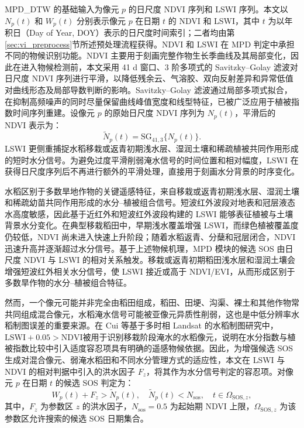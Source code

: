 MPD\_DTW 的基础输入为像元 \(p\) 的日尺度 NDVI 序列和 LSWI 序列。本文以 \(N_p(t)\) 和 \(W_p(t)\) 分别表示像元 \(p\) 在日期 \(t\) 的 NDVI 和 LSWI，其中 \(t\) 为以年积日（Day of Year, DOY）表示的日尺度时间索引；二者均由第\ref{sec:vi_preprocess}节所述预处理流程获得。NDVI 和 LSWI 在 MPD 判定中承担不同的物候识别功能。NDVI 主要用于刻画完整作物生长季曲线及其局部变化，因此在进入物候检测前，本文采用 41 d 窗口、3 阶多项式的 Savitzky--Golay 滤波对日尺度 NDVI 序列进行平滑，以降低残余云、气溶胶、双向反射差异和异常低值对曲线形态及局部导数判断的影响。Savitzky--Golay 滤波通过局部多项式拟合，在抑制高频噪声的同时尽量保留曲线峰值宽度和线型特征，已被广泛应用于植被指数时间序列重建\cite{Chen2004RSE}。设像元 \(p\) 的原始日尺度 NDVI 序列为 \(N_p(t)\)，平滑后的 NDVI 表示为：
\begin{equation}
    \widetilde{N}_p(t)=\mathrm{SG}_{41,3}\{N_p(t)\}.
    \label{eq:sg_ndvi}
\end{equation}
LSWI 更侧重捕捉水稻移栽或返青初期浅水层、湿润土壤和稀疏植被共同作用形成的短时水分信号。为避免过度平滑削弱淹水信号的时间位置和相对幅度，LSWI 在获得日尺度序列后不再进行额外的平滑处理，直接用于刻画水分背景的时序变化。

水稻区别于多数旱地作物的关键遥感特征，来自移栽或返青初期浅水层、湿润土壤和稀疏幼苗共同作用形成的水分--植被组合信号。短波红外波段对地表和冠层液态水高度敏感，因此基于近红外和短波红外波段构建的 LSWI 能够表征植被与土壤背景水分变化\cite{Gao1996}。在典型移栽稻田中，早期浅水覆盖增强 LSWI，而绿色植被覆盖度仍较低，NDVI 尚未进入快速上升阶段；随着水稻返青、分蘖和冠层闭合，NDVI 迅速升高并逐渐超过水分信号。基于上述物候机理，MPD 模块的候选 SOS 由日尺度 NDVI 与 LSWI 的相对关系触发。移栽或返青初期稻田浅水层和湿润土壤会增强短波红外相关水分信号，使 LSWI 接近或高于 NDVI/EVI，从而形成区别于多数旱作物的水分--植被组合特征\cite{Xiao2005,Xiao2006}。

然而，一个像元可能并非完全由稻田组成，稻田、田埂、沟渠、裸土和其他作物常共同组成混合像元，水稻淹水信号可能被亚像元异质性削弱，这也是中低分辨率水稻制图误差的重要来源\cite{Teluguntla2015RS,Han2021}。在 Cui 等基于多时相 Landsat 的水稻制图研究中，\(\mathrm{LSWI}+0.05>\mathrm{NDVI}\)被用于识别移栽阶段淹水的水稻像元\cite{Cui2015}，说明在水分指数与植被指数比较中引入适度容忍项具有明确的遥感物候依据。因此，为增强候选 SOS 生成对混合像元、弱淹水稻田和不同水分管理方式的适应性，本文在 LSWI 与 NDVI 的相对判据中引入的洪水因子 \(F_z\)，将其作为水分信号判定的容忍项。对像元 \(p\) 在日期 \(t\) 的候选 SOS 判定为：
\begin{equation}
    W_p(t)+F_z>\widetilde{N}_p(t), \quad
\widetilde{N}_p(t)<N_{\mathrm{sos}}, \quad
    t\in\Omega_{\mathrm{SOS},z},
    \label{eq:sos_condition}
\end{equation}
其中，\(F_z\) 为参数区 \(z\) 的洪水因子，\(N_{\mathrm{sos}}=0.5\) 为起始期 NDVI 上限，\(\Omega_{\mathrm{SOS},z}\) 为该参数区允许搜索的候选 SOS 日期集合。


